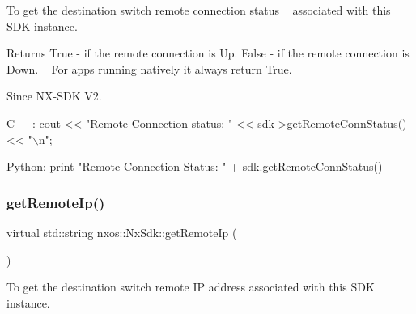 To get the destination switch remote connection status ~\newline
associated with this S\+DK instance. ~\newline
 \begin{DoxyReturn}{Returns}
True -\/ if the remote connection is Up. False -\/ if the remote connection is Down. ~\newline
 For apps running natively it always return True.
\end{DoxyReturn}
\begin{DoxySince}{Since}
N\+X-\/\+S\+DK V2. ~\newline
 
\begin{DoxyCode}
C++:                                                       
     cout << \textcolor{stringliteral}{"Remote Connection status: "} << sdk->getRemoteConnStatus() << \textcolor{stringliteral}{"\(\backslash\)n"};                         
                                                                                      
Python:                                                 
   print \textcolor{stringliteral}{"Remote Connection Status:  "} + sdk.getRemoteConnStatus()                                     
\end{DoxyCode}
 
\end{DoxySince}
\mbox{\label{classnxos_1_1_nx_sdk_ad5cec82b30925240ce24e052b4c800c4}} 
\subsubsection{\texorpdfstring{get\+Remote\+Ip()}{getRemoteIp()}}
{\footnotesize\ttfamily virtual std\+::string nxos\+::\+Nx\+Sdk\+::get\+Remote\+Ip (\begin{DoxyParamCaption}{ }\end{DoxyParamCaption})\hspace{0.3cm}{\ttfamily [pure virtual]}}

To get the destination switch remote IP address associated with this S\+DK instance.

